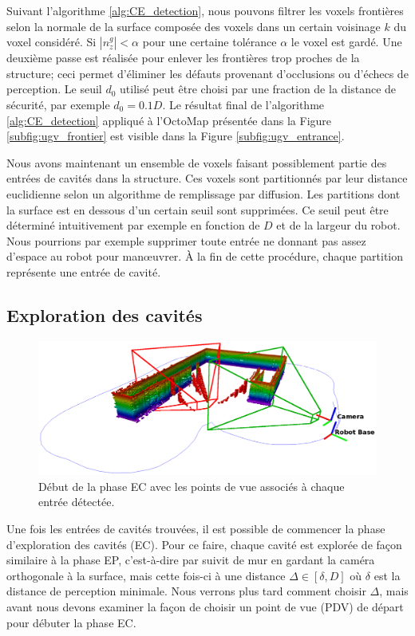Suivant l'algorithme \ref{alg:CE_detection}, nous pouvons filtrer les voxels frontières selon la normale de la surface composée des voxels dans un certain voisinage $k$ du voxel considéré. Si $| n_z^g | < \alpha$ pour une certaine tolérance $\alpha$ le voxel est gardé. Une deuxième passe est réalisée pour enlever les frontières trop proches de la structure; ceci permet d'éliminer les défauts provenant d'occlusions ou d'échecs de perception. Le seuil $d_0$ utilisé peut être choisi par une fraction de la distance de sécurité, par exemple $d_0 = 0.1D$. Le résultat final de l'algorithme \ref{alg:CE_detection} appliqué à l'OctoMap présentée dans la Figure \ref{subfig:ugv_frontier} est visible dans la Figure \ref{subfig:ugv_entrance}.

Nous avons maintenant un ensemble de voxels faisant possiblement partie des entrées de cavités dans la structure. Ces voxels sont partitionnés par leur distance euclidienne selon un algorithme de remplissage par diffusion. Les partitions dont la surface est en dessous d'un certain seuil sont supprimées. Ce seuil peut être déterminé intuitivement par exemple en fonction de $D$ et de la largeur du robot. Nous pourrions par exemple supprimer toute entrée ne donnant pas assez d'espace au robot pour man{\oe}uvrer. À la fin de cette procédure, chaque partition représente une entrée de cavité.

\subsection{Exploration des cavités}

\begin{figure}[ht]
  \centering
  \includegraphics[width=0.8\linewidth]{images/CE_start}
  \caption{Début de la phase EC avec les points de vue associés à chaque entrée détectée.}
  \label{ugv:debut_ec}
\end{figure}

Une fois les entrées de cavités trouvées, il est possible de commencer la phase d'exploration des cavités (EC). Pour ce faire, chaque cavité est explorée de façon similaire à la phase EP, c'est-à-dire par suivit de mur en gardant la caméra orthogonale à la surface, mais cette fois-ci à une distance $\Delta \in [\delta, D]$ où $\delta$ est la distance de perception minimale. Nous verrons plus tard comment choisir $\Delta$, mais avant nous devons examiner la façon de choisir un point de vue (PDV) de départ pour débuter la phase EC.

